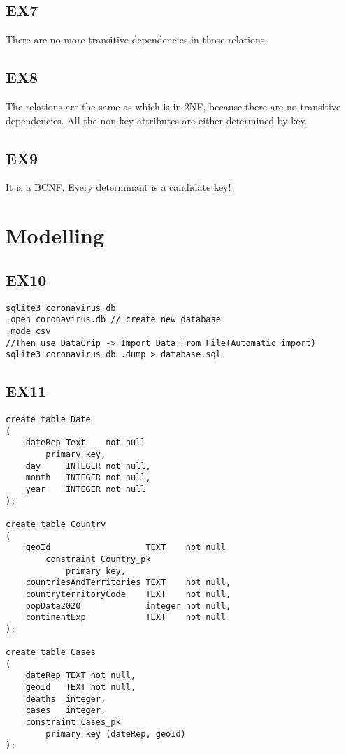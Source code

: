 \documentclass[]{article}
\begin{document}
\subsection{EX7}
There are no more transitive dependencies in those relations.


\subsection{EX8}
The relations are the same as which is in 2NF, because there are no transitive dependencies.
All the non key attributes are either determined by key.

\subsection{EX9}
It is a BCNF.
Every determinant is a candidate key!


\newpage
\section{Modelling}

\subsection{EX10}
\begin{verbatim}
sqlite3 coronavirus.db 
.open coronavirus.db // create new database
.mode csv 
//Then use DataGrip -> Import Data From File(Automatic import)
sqlite3 coronavirus.db .dump > database.sql
\end{verbatim}

\subsection{EX11}
\begin{verbatim}
create table Date
(
    dateRep Text    not null
        primary key,
    day     INTEGER not null,
    month   INTEGER not null,
    year    INTEGER not null
);

create table Country
(
    geoId                   TEXT    not null
        constraint Country_pk
            primary key,
    countriesAndTerritories TEXT    not null,
    countryterritoryCode    TEXT    not null,
    popData2020             integer not null,
    continentExp            TEXT    not null
);

create table Cases
(
    dateRep TEXT not null,
    geoId   TEXT not null,
    deaths  integer,
    cases   integer,
    constraint Cases_pk
        primary key (dateRep, geoId)
);

\end{verbatim}
\end{document}
